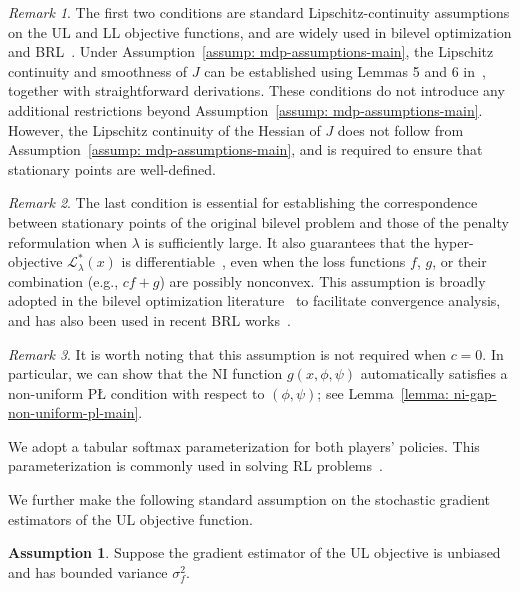 \documentclass{article}
\theoremstyle{plain}
\theoremstyle{definition}
\newtheorem{assumption}{Assumption}
\theoremstyle{remark}
\newtheorem{remark}{Remark}
\begin{document}
\begin{remark}
The first two conditions are standard Lipschitz-continuity assumptions on the UL and LL objective functions, and are widely used in bilevel optimization and BRL~\cite{chen2024finding,gaur2025on}. 
Under Assumption~\ref{assump: mdp-assumptions-main}, the Lipschitz continuity and smoothness of $J$ can be established using Lemmas 5 and 6 in~\citet{zeng2022regularized}, together with straightforward derivations. 
These conditions do not introduce any additional restrictions beyond Assumption~\ref{assump: mdp-assumptions-main}. 
However, the Lipschitz continuity of the Hessian of $J$ does not follow from Assumption~\ref{assump: mdp-assumptions-main}, and is required to ensure that stationary points are well-defined.
\end{remark}
    

\begin{remark}
The last condition is essential for establishing the correspondence between stationary points of the original bilevel problem and those of the penalty reformulation when $\lambda$ is sufficiently large. It also guarantees that the hyper-objective $\mathcal{L}_\lambda^*(x)$ is differentiable~\cite{kwon2023penalty,chen2024finding}, even when the loss functions $f$, $g$, or their combination (e.g., $cf+g$) are possibly nonconvex. This assumption is broadly adopted in the bilevel optimization literature~\cite{kwon2023penalty,chen2024finding,jiang2025beyond} to facilitate convergence analysis, and has also been used in recent BRL works~\cite{gaur2025on,zeng2025regularized}.    
\end{remark} 

\begin{remark}
It is worth noting that this assumption is not required when $c=0$. In particular, we can show that the NI function $g(x,\phi,\psi)$ automatically satisfies a non-uniform P{\L} condition with respect to $(\phi,\psi)$; see Lemma~\ref{lemma: ni-gap-non-uniform-pl-main}.    
\end{remark} 



\vspace{-1mm}
We adopt a tabular softmax parameterization for both players' policies. This parameterization is commonly used in solving RL problems~\citep{mei2020global,zeng2022regularized,zeng2025regularized}.

\vspace{-1mm}
We further make the following standard assumption on the stochastic gradient estimators of the UL objective function.
\vspace{-1mm}
\begin{assumption}
\label{assump: stochastic-gradient-assumptions-main}
Suppose the gradient estimator of the UL objective is unbiased and has bounded variance $\sigma_f^2$.
\end{assumption}
\end{document}
